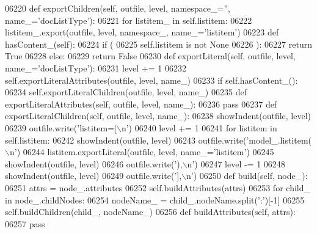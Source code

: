\begin{DoxyCode}
{{{{{{{{{{{{{{{{{{{{{{{{{{{{{{{{{{{{{{{{{{{{{{{{{{{{{{{{{{{{{{{{{{{{{{{{{{{{{{{{{{{{{{{{{{{{{{{{{{{{{{{{{{{{{{{{{{{{{{{{{{{{{{{{{{{{{{{{{{{{{{{{{{{{{{{{{{{{{{{{{{{{{{{{{{{{{{{{{{{{{{{{{{{{{{{{{{{{{{{{{{{{{{{{{{{{{{{{{{{{{{{{{{{{{{{{{{{{{{{{{{{{{{{{{{{{{{{{{{{{{{{{{{{{{{{{{{{{{{{{{{{{{{{{{{{{{{{{{{{{{{{{{{{{{{{{{{{{{{{{{{{{{{{{{{{{{{{{{{{{{{{{{{{{{{{{{{{{{{{{{{{{{{{{{{{{{{{{{{{{{{{{{{{{{{06220     \textcolor{keyword}{def }exportChildren(self, outfile, level, namespace\_='', name\_='docListType'):
06221         \textcolor{keywordflow}{for} listitem\_ \textcolor{keywordflow}{in} self.listitem:
06222             listitem\_.export(outfile, level, namespace\_, name\_=\textcolor{stringliteral}{'listitem'})
06223     \textcolor{keyword}{def }hasContent_(self):
06224         \textcolor{keywordflow}{if} (
06225             self.listitem \textcolor{keywordflow}{is} \textcolor{keywordflow}{not} \textcolor{keywordtype}{None}
06226             ):
06227             \textcolor{keywordflow}{return} \textcolor{keyword}{True}
06228         \textcolor{keywordflow}{else}:
06229             \textcolor{keywordflow}{return} \textcolor{keyword}{False}
06230     \textcolor{keyword}{def }exportLiteral(self, outfile, level, name\_='docListType'):
06231         level += 1
06232         self.exportLiteralAttributes(outfile, level, name\_)
06233         \textcolor{keywordflow}{if} self.hasContent_():
06234             self.exportLiteralChildren(outfile, level, name\_)
06235     \textcolor{keyword}{def }exportLiteralAttributes(self, outfile, level, name\_):
06236         \textcolor{keywordflow}{pass}
06237     \textcolor{keyword}{def }exportLiteralChildren(self, outfile, level, name\_):
06238         showIndent(outfile, level)
06239         outfile.write(\textcolor{stringliteral}{'listitem=[\(\backslash\)n'})
06240         level += 1
06241         \textcolor{keywordflow}{for} listitem \textcolor{keywordflow}{in} self.listitem:
06242             showIndent(outfile, level)
06243             outfile.write(\textcolor{stringliteral}{'model\_.listitem(\(\backslash\)n'})
06244             listitem.exportLiteral(outfile, level, name\_=\textcolor{stringliteral}{'listitem'})
06245             showIndent(outfile, level)
06246             outfile.write(\textcolor{stringliteral}{'),\(\backslash\)n'})
06247         level -= 1
06248         showIndent(outfile, level)
06249         outfile.write(\textcolor{stringliteral}{'],\(\backslash\)n'})
06250     \textcolor{keyword}{def }build(self, node\_):
06251         attrs = node\_.attributes
06252         self.buildAttributes(attrs)
06253         \textcolor{keywordflow}{for} child\_ \textcolor{keywordflow}{in} node\_.childNodes:
06254             nodeName\_ = child\_.nodeName.split(\textcolor{stringliteral}{':'})[-1]
06255             self.buildChildren(child\_, nodeName\_)
06256     \textcolor{keyword}{def }buildAttributes(self, attrs):
06257         \textcolor{keywordflow}{pass}
}}}}}}}}}}}}}}}}}}}}}}}}}}}}}}}}}}}}}}}}}}}}}}}}}}}}}}}}}}}}}}}}}}}}}}}}}}}}}}}}}}}}}}}}}}}}}}}}}}}}}}}}}}}}}}}}}}}}}}}}}}}}}}}}}}}}}}}}}}}}}}}}}}}}}}}}}}}}}}}}}}}}}}}}}}}}}}}}}}}}}}}}}}}}}}}}}}}}}}}}}}}}}}}}}}}}}}}}}}}}}}}}}}}}}}}}}}}}}}}}}}}}}}}}}}}}}}}}}}}}}}}}}}}}}}}}}}}}}}}}}}}}}}}}}}}}}}}}}}}}}}}}}}}}}}}}}}}}}}}}}}}}}}}}}}}}}}}}}}}}}}}}}}}}}}}}}}}}}}}}}}}}}}}}}}}}}}}}}}}}}}}}}}}}}}
\end{DoxyCode}
